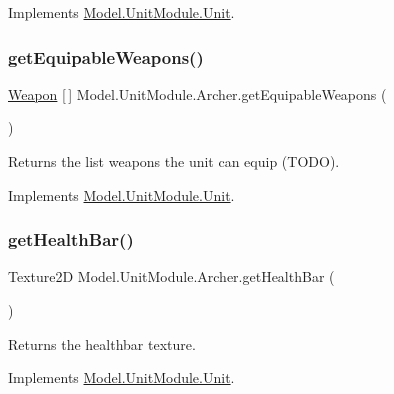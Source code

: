 Implements \hyperlink{interface_model_1_1_unit_module_1_1_unit_accb79e396c6066707f2d11f63e3fdd99}{Model.\+Unit\+Module.\+Unit}.

\hypertarget{class_model_1_1_unit_module_1_1_archer_a470c428226089a8872e1bc3901388196}{}\label{class_model_1_1_unit_module_1_1_archer_a470c428226089a8872e1bc3901388196} 
\subsubsection{\texorpdfstring{get\+Equipable\+Weapons()}{getEquipableWeapons()}}
{\footnotesize\ttfamily \hyperlink{interface_model_1_1_weapon_module_1_1_weapon}{Weapon} \mbox{[}$\,$\mbox{]} Model.\+Unit\+Module.\+Archer.\+get\+Equipable\+Weapons (\begin{DoxyParamCaption}{ }\end{DoxyParamCaption})\hspace{0.3cm}{\ttfamily [inline]}}

Returns the list weapons the unit can equip (T\+O\+DO). 

Implements \hyperlink{interface_model_1_1_unit_module_1_1_unit_a7b64e60f28d516a5fb4e28a9b7cd8eec}{Model.\+Unit\+Module.\+Unit}.

\hypertarget{class_model_1_1_unit_module_1_1_archer_a113518d26ecdbf45aca30fed1f884b3b}{}\label{class_model_1_1_unit_module_1_1_archer_a113518d26ecdbf45aca30fed1f884b3b} 
\subsubsection{\texorpdfstring{get\+Health\+Bar()}{getHealthBar()}}
{\footnotesize\ttfamily Texture2D Model.\+Unit\+Module.\+Archer.\+get\+Health\+Bar (\begin{DoxyParamCaption}{ }\end{DoxyParamCaption})\hspace{0.3cm}{\ttfamily [inline]}}

Returns the healthbar texture. 

Implements \hyperlink{interface_model_1_1_unit_module_1_1_unit_a5be18da3857bb22525feb89dd49b76b1}{Model.\+Unit\+Module.\+Unit}.

